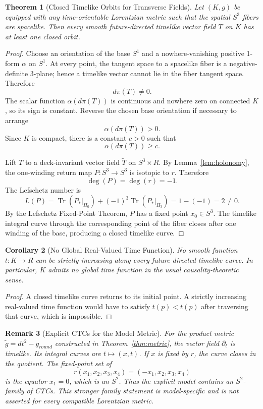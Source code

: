 \documentclass[11pt]{article}
\theoremstyle{canonmath}
\newtheorem{theorem}{Theorem}[section]
\newtheorem{corollary}[theorem]{Corollary}
\newtheorem{remark}[theorem]{Remark}
\theoremstyle{canonpostulate}
\theoremstyle{canonproposition}
\providecommand{\Klein}{\mathcal{K}}
\providecommand{\R}{\mathbb{R}}
\providecommand{\Sone}{S^1}
\providecommand{\Sthree}{S^3}
\providecommand{\Tr}{\operatorname{Tr}}
\providecommand{\degfn}{\operatorname{deg}}
\def\mathrm#1{#1}%
\def\mathbb#1{#1}%
\def\mathcal#1{#1}%
\begin{document}
\begin{theorem}[Closed Timelike Orbits for Transverse Fields] \label{thm:ctc}
Let $(\Klein,g)$ be equipped with any time-orientable Lorentzian metric such that the spatial $\Sthree$ fibers are spacelike. Then every smooth future-directed timelike vector field $T$ on $\Klein$ has at least one closed orbit.
\end{theorem}
\begin{proof}
Choose an orientation of the base $\Sone$ and a nowhere-vanishing positive 1-form $\alpha$ on $\Sone$. At every point, the tangent space to a spacelike fiber is a negative-definite 3-plane; hence a timelike vector cannot lie in the fiber tangent space. Therefore
\[
d\pi(T)\neq0.
\]
The scalar function $\alpha(d\pi(T))$ is continuous and nowhere zero on connected $\Klein$, so its sign is constant. Reverse the chosen base orientation if necessary to arrange
\[
\alpha(d\pi(T))>0.
\]
Since $\Klein$ is compact, there is a constant $c>0$ such that
\[
\alpha(d\pi(T))\ge c.
\]

Lift $T$ to a deck-invariant vector field $\widetilde T$ on $\Sthree\times\R$. By Lemma~\ref{lem:holonomy}, the one-winding return map $P:\Sthree\to\Sthree$ is isotopic to $r$. Therefore
\[
\degfn(P)=\degfn(r)=-1.
\]
The Lefschetz number is
\begin{equation}
L(P)=\Tr(P_*|_{H_0})+(-1)^3\Tr(P_*|_{H_3})
=1-(-1)=2\neq0.
\end{equation}
By the Lefschetz Fixed-Point Theorem, $P$ has a fixed point $x_0\in\Sthree$. The timelike integral curve through the corresponding point of the fiber closes after one winding of the base, producing a closed timelike curve.
\end{proof}

\begin{corollary}[No Global Real-Valued Time Function] \label{cor:notimefunction}
No smooth function $t:\Klein\to\R$ can be strictly increasing along every future-directed timelike curve. In particular, $\Klein$ admits no global time function in the usual causality-theoretic sense.
\end{corollary}
\begin{proof}
A closed timelike curve returns to its initial point. A strictly increasing real-valued time function would have to satisfy $t(p)<t(p)$ after traversing that curve, which is impossible.
\end{proof}

\begin{remark}[Explicit CTCs for the Model Metric]
For the product metric $\tilde g=dt^2-g_{\mathrm{round}}$ constructed in Theorem~\ref{thm:metric}, the vector field $\partial_t$ is timelike. Its integral curves are $t\mapsto(x,t)$. If $x$ is fixed by $r$, the curve closes in the quotient. The fixed-point set of
\[
r(x_1,x_2,x_3,x_4)=(-x_1,x_2,x_3,x_4)
\]
is the equator $x_1=0$, which is an $S^2$. Thus the explicit model contains an $S^2$-family of CTCs. This stronger family statement is model-specific and is not asserted for every compatible Lorentzian metric.
\end{remark}
\end{document}
